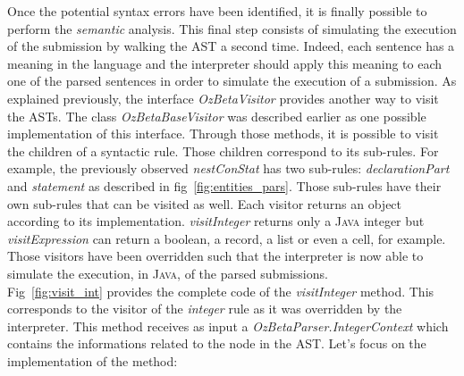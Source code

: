 \documentclass[11pt,a4paper,twoside,openright]{report}
\begin{document}
Once the potential syntax errors have been identified, it is finally possible 
to perform the \textit{semantic} analysis. This final step consists of 
simulating the execution of the submission by walking the AST a second time. 
Indeed, each sentence has a meaning in the language and the interpreter should 
apply this meaning to each one of the parsed sentences in order to simulate the 
execution of a submission. As explained previously, the interface
\textit{OzBetaVisitor} provides another way to visit the ASTs. The class 
\textit{OzBetaBaseVisitor} was described earlier as one possible implementation 
of this interface. Through those methods, it is possible to visit the children 
of a syntactic rule. Those children correspond to its sub-rules. For example, 
the previously observed \textit{nestConStat} has two sub-rules: 
\textit{declarationPart} and \textit{statement} as described in 
fig~\ref{fig:entities_pars}. Those sub-rules have their own sub-rules that can be 
visited as well. Each visitor returns an object according to its implementation. 
\textit{visitInteger} returns only a \textsc{Java} integer but 
\textit{visitExpression} can return a boolean, a record, a list or even a cell, 
for example. Those visitors have been overridden such that the interpreter is 
now able to simulate the execution, in \textsc{Java}, of the parsed 
submissions.\\

Fig~\ref{fig:visit_int} provides the complete code of the 
\textit{visitInteger} method. This corresponds to the visitor of the 
\textit{integer} rule as it was overridden by the interpreter. This method 
receives as input a \textit{OzBetaParser.IntegerContext} which contains 
the informations related to the node in the AST. Let's focus on the 
implementation of the method:
\end{document}
